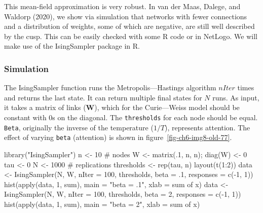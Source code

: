 \documentclass[
  a4paper,
  DIV=11,
  numbers=noendperiod,
  oneside]{scrreprt}
\newenvironment{Shaded}{}{}
\newcommand{\AttributeTok}[1]{\textcolor[rgb]{0.84,0.23,0.29}{#1}}
\newcommand{\CommentTok}[1]{\textcolor[rgb]{0.42,0.45,0.49}{#1}}
\newcommand{\DecValTok}[1]{\textcolor[rgb]{0.00,0.36,0.77}{#1}}
\newcommand{\FunctionTok}[1]{\textcolor[rgb]{0.44,0.26,0.76}{#1}}
\newcommand{\NormalTok}[1]{\textcolor[rgb]{0.14,0.16,0.18}{#1}}
\newcommand{\OtherTok}[1]{\textcolor[rgb]{0.44,0.26,0.76}{#1}}
\newcommand{\SpecialCharTok}[1]{\textcolor[rgb]{0.00,0.36,0.77}{#1}}
\newcommand{\StringTok}[1]{\textcolor[rgb]{0.01,0.18,0.38}{#1}}
\begin{document}
This mean-field approximation is very robust. In van der Maas, Dalege,
and Waldorp (2020), we show via simulation that networks with fewer
connections and a distribution of weights, some of which are negative,
are still well described by the cusp. This can be easily checked with
some R code or in NetLogo. We will make use of the IsingSampler package
in R.

\subsubsection{Simulation}\label{sec-Simulation}

The IsingSampler function runs the Metropolis---Hastings algorithm
\(nIter\) times and returns the last state. It can return multiple final
states for \(N\) runs. As input, it takes a matrix of links
(\(\mathbf{W}\)), which for the Curie---Weiss model should be constant
with 0s on the diagonal. The \texttt{thresholds} for each node should be
equal. \texttt{Beta}, originally the inverse of the temperature
(\(1/T\)), represents attention. The effect of varying \texttt{beta}
(attention) is shown in figure~\ref{fig-ch6-img8-old-77}.

\begin{Shaded}
\begin{Highlighting}[]
\FunctionTok{library}\NormalTok{(}\StringTok{"IsingSampler"}\NormalTok{)}
\NormalTok{n }\OtherTok{\textless{}{-}} \DecValTok{10} \CommentTok{\# nodes}
\NormalTok{W }\OtherTok{\textless{}{-}} \FunctionTok{matrix}\NormalTok{(.}\DecValTok{1}\NormalTok{, n, n); }\FunctionTok{diag}\NormalTok{(W) }\OtherTok{\textless{}{-}} \DecValTok{0}
\NormalTok{tau }\OtherTok{\textless{}{-}} \DecValTok{0}
\NormalTok{N }\OtherTok{\textless{}{-}} \DecValTok{1000} \CommentTok{\# replications}
\NormalTok{thresholds }\OtherTok{\textless{}{-}} \FunctionTok{rep}\NormalTok{(tau, n)}
\FunctionTok{layout}\NormalTok{(}\FunctionTok{t}\NormalTok{(}\DecValTok{1}\SpecialCharTok{:}\DecValTok{2}\NormalTok{))}
\NormalTok{data }\OtherTok{\textless{}{-}} \FunctionTok{IsingSampler}\NormalTok{(N, W, }\AttributeTok{nIter =} \DecValTok{100}\NormalTok{, thresholds, }
            \AttributeTok{beta =}\NormalTok{ .}\DecValTok{1}\NormalTok{, }\AttributeTok{responses =} \FunctionTok{c}\NormalTok{(}\SpecialCharTok{{-}}\DecValTok{1}\NormalTok{, }\DecValTok{1}\NormalTok{))}
\FunctionTok{hist}\NormalTok{(}\FunctionTok{apply}\NormalTok{(data, }\DecValTok{1}\NormalTok{, sum), }\AttributeTok{main =} \StringTok{"beta = .1"}\NormalTok{, }\AttributeTok{xlab =} \StringTok{\textquotesingle{}sum of x\textquotesingle{}}\NormalTok{)}
\NormalTok{data }\OtherTok{\textless{}{-}} \FunctionTok{IsingSampler}\NormalTok{(N, W, }\AttributeTok{nIter =} \DecValTok{100}\NormalTok{, thresholds, }
            \AttributeTok{beta =} \DecValTok{2}\NormalTok{, }\AttributeTok{responses =} \FunctionTok{c}\NormalTok{(}\SpecialCharTok{{-}}\DecValTok{1}\NormalTok{, }\DecValTok{1}\NormalTok{))}
\FunctionTok{hist}\NormalTok{(}\FunctionTok{apply}\NormalTok{(data, }\DecValTok{1}\NormalTok{, sum), }\AttributeTok{main =} \StringTok{"beta = 2"}\NormalTok{, }\AttributeTok{xlab =} \StringTok{\textquotesingle{}sum of x\textquotesingle{}}\NormalTok{)}
\end{Highlighting}
\end{Shaded}
\end{document}
